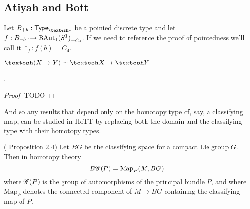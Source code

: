 \documentclass[12pt]{article}
\begin{document}
\subsection{Atiyah and Bott}

Let \( \Bpb:\Typesp \) be a pointed discrete type and let \( f:{B}_{+{b}}\,\cdot\!\to{\mathrm{BAut}_1(S^1)}_{+{C_4}} \). If we need to reference the proof of pointedness we'll call it \( *_f:f(b)=C_4 \). 

\begin{mylemma} \( \shape(X\to Y)\simeq \shape X\to \shape Y \)\end{mylemma}.
\begin{proof}
TODO
\end{proof}

And so any results that depend only on the homotopy type of, say, a classifying map, can be studied in HoTT by replacing both the domain and the classifying type with their homotopy types.

\begin{myprop}(\cite{atiyah1983yang} Proposition 2.4)
  Let \( BG \) be the classifying space for a compact Lie group \( G \). Then in homotopy theory 
  \[ 
    B\mathscr{G}(P)=\mathrm{Map}_P(M, BG) 
  \]
  where \( \mathscr{G}(P) \) is the group of automorphisms of the principal bundle \( P \), and where \( \mathrm{Map}_P \) denotes the connected component of \( M\to BG \) containing the classifying map of \( P \).
\end{myprop}


\end{document}
